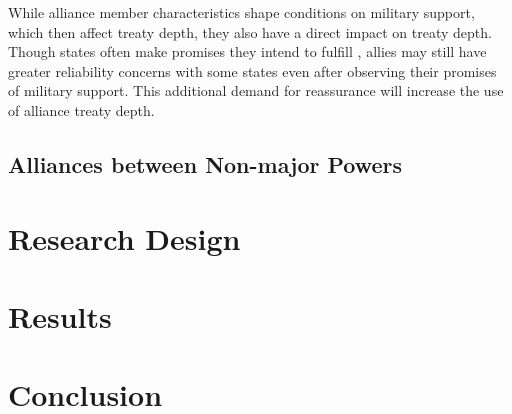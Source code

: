 \documentclass[12pt]{article}
\begin{document}
While alliance member characteristics shape conditions on military support, which then affect treaty depth, they also have a direct impact on treaty depth.  
Though states often make promises they intend to fulfill \citep{DownsRockeBarsoom1996, Chibaetal2015}, allies may still have greater reliability concerns with some states even after observing their promises of military support. 
This additional demand for reassurance will increase the use of alliance treaty depth. 





\subsection{Alliances between Non-major Powers}







\section{Research Design}



\section{Results}


\section{Conclusion}




\singlespace
 
 
\end{document}
